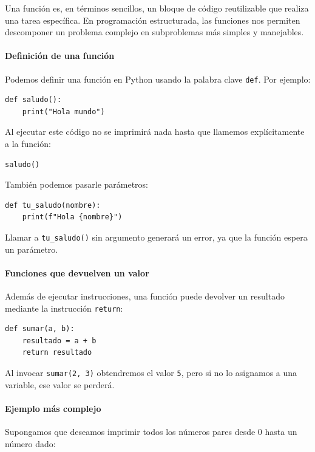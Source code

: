 \documentclass{article}
\theoremstyle{nonumberplain}
\begin{document}
Una función es, en términos sencillos, un bloque de código reutilizable que realiza una tarea específica. En programación estructurada, las funciones nos permiten descomponer un problema complejo en subproblemas más simples y manejables.

\paragraph{Definición de una función}

Podemos definir una función en Python usando la palabra clave \texttt{def}. Por ejemplo:

\begin{verbatim}
def saludo():
    print("Hola mundo")
\end{verbatim}

Al ejecutar este código no se imprimirá nada hasta que llamemos explícitamente a la función:

\begin{verbatim}
saludo()
\end{verbatim}

También podemos pasarle parámetros:

\begin{verbatim}
def tu_saludo(nombre):
    print(f"Hola {nombre}")
\end{verbatim}

Llamar a \texttt{tu\_saludo()} sin argumento generará un error, ya que la función espera un parámetro.

\paragraph{Funciones que devuelven un valor}

Además de ejecutar instrucciones, una función puede devolver un resultado mediante la instrucción \texttt{return}:

\begin{verbatim}
def sumar(a, b):
    resultado = a + b
    return resultado
\end{verbatim}

Al invocar \texttt{sumar(2, 3)} obtendremos el valor \texttt{5}, pero si no lo asignamos a una variable, ese valor se perderá.

\paragraph{Ejemplo más complejo}

Supongamos que deseamos imprimir todos los números pares desde 0 hasta un número dado:
\end{document}
